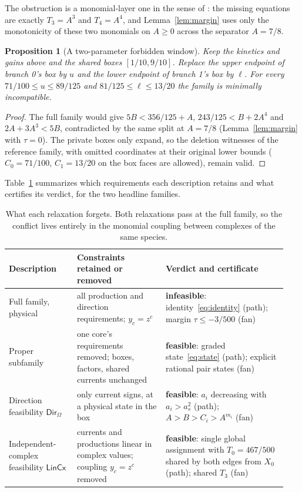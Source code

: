 \documentclass[11pt,a4paper]{article}
\theoremstyle{plain}
\newtheorem{proposition}[theorem]{Proposition}
\theoremstyle{definition}
\theoremstyle{remark}
\newcommand{\DIR}{\mathsf{Dir}}
\newcommand{\LIN}{\mathsf{LinCx}}
\begin{document}
The obstruction is a monomial-layer one in the sense of \citep{tcic2026}: the missing equations are exactly $T_3=A^3$ and $T_4=A^4$, and Lemma~\ref{lem:margin} uses only the monotonicity of these two monomials on $A\ge0$ across the separator $A=7/8$.

\begin{proposition}[A two-parameter forbidden window]\label{prop:window}
Keep the kinetics and gains above and the shared boxes $[1/10,9/10]$. Replace the upper endpoint of branch 0's box by $u$ and the lower endpoint of branch 1's box by $\ell$. For every $71/100\le u\le89/125$ and $81/125\le\ell\le13/20$ the family is minimally incompatible.
\end{proposition}
\begin{proof}
The full family would give $5B<356/125+A$, $243/125<B+2A^4$ and $2A+3A^3<5B$, contradicted by the same split at $A=7/8$ (Lemma~\ref{lem:margin} with $\tau=0$). The private boxes only expand, so the deletion witnesses of the reference family, with omitted coordinates at their original lower bounds ($C_0=71/100$, $C_1=13/20$ on the box faces are allowed), remain valid.
\end{proof}

Table~\ref{tab:relax} summarizes which requirements each description retains and what certifies its verdict, for the two headline families.

\begin{table}[t]
\centering
\small
\begin{tabular}{@{}>{\raggedright\arraybackslash}p{0.23\linewidth}>{\raggedright\arraybackslash}p{0.30\linewidth}>{\raggedright\arraybackslash}p{0.41\linewidth}@{}}
\toprule
Description & Constraints retained or removed & Verdict and certificate \\
\midrule
Full family, physical & all production and direction requirements; $y_c=z^c$ & \textbf{infeasible}: identity~\eqref{eq:identity} (path); margin $\tau\le-3/500$ (fan) \\
Proper subfamily & one core's requirements removed; boxes, factors, shared currents unchanged & \textbf{feasible}: graded state~\eqref{eq:state} (path); explicit rational pair states (fan) \\
Direction feasibility $\DIR_\Omega$ & only current signs, at a physical state in the box & \textbf{feasible}: $a_i$ decreasing with $a_i>a_s^2$ (path); $A>B>C_i>A^{m_i}$ (fan) \\
Independent-complex feasibility $\LIN$ & currents and productions linear in complex values; coupling $y_c=z^c$ removed & \textbf{feasible}: single global assignment with $T_0=467/500$ shared by both edges from $X_0$ (path); shared $T_3$ (fan) \\
\bottomrule
\end{tabular}
\caption{What each relaxation forgets. Both relaxations pass at the full family, so the conflict lives entirely in the monomial coupling between complexes of the same species.}
\label{tab:relax}
\end{table}
\end{document}
